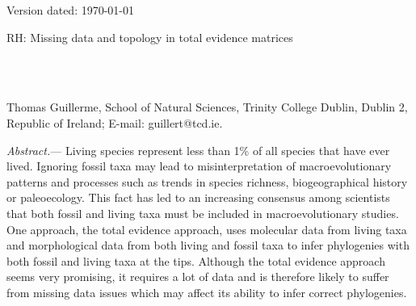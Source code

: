 \documentclass[12pt,letterpaper]{article}
\renewcommand{\subsubsection}[1]{%
\vspace{2ex}
\noindent
\textit{#1.}---}
\begin{document}
\begin{flushright}
Version dated: \today
\end{flushright}
\bigskip
\noindent RH: Missing data and topology in total evidence matrices %

\bigskip
\medskip
\begin{center}

\bigskip

\\
\\
\end{center}
\medskip
{} Thomas Guillerme, School of Natural Sciences, Trinity College Dublin, Dublin 2, Republic of Ireland; E-mail: guillert@tcd.ie.\\
\vspace{1in}


%
%


\subsubsection{Abstract}
Living species represent less than 1\% of all species that have ever lived. Ignoring fossil taxa may lead to misinterpretation of macroevolutionary patterns and processes such as trends in species richness, biogeographical history or paleoecology.
This fact has led to an increasing consensus among scientists that both fossil and living taxa must be included in macroevolutionary studies.
One approach, the total evidence approach, uses molecular data from living taxa and morphological data from both living and fossil taxa to infer phylogenies with both fossil and living taxa at the tips.
Although the total evidence approach seems very promising, it requires a lot of data and is therefore likely to suffer from missing data issues which may affect its ability to infer correct phylogenies.
\end{document}
